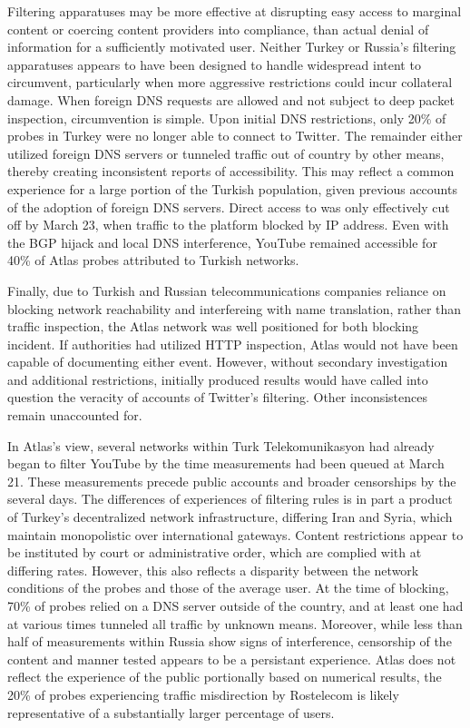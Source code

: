 Filtering apparatuses may be more effective at disrupting easy access to marginal content or coercing content providers into compliance, than actual denial of information for a sufficiently motivated user. Neither Turkey or Russia's filtering apparatuses appears to have been designed to handle widespread intent to circumvent, particularly when more aggressive restrictions could incur collateral damage. When foreign DNS requests are allowed and not subject to deep packet inspection, circumvention is simple. Upon initial DNS restrictions, only 20\% of probes in Turkey were no longer able to connect to Twitter. The remainder either utilized foreign DNS servers or tunneled traffic out of country by other means, thereby creating inconsistent reports of accessibility. This may reflect a common experience for a large portion of the Turkish population, given previous accounts of the adoption of foreign DNS servers. Direct access to  was only effectively cut off by March 23, when traffic to the platform blocked by IP address. Even with the BGP hijack and local DNS interference, YouTube remained accessible for 40\% of Atlas probes attributed to Turkish networks. 

Finally, due to Turkish and Russian telecommunications companies reliance on blocking network reachability and interfereing with name translation, rather than traffic inspection, the Atlas network was well positioned for both blocking incident. If authorities had utilized HTTP inspection, Atlas would not have been capable of documenting either event. However, without secondary investigation and additional restrictions, initially produced results would have called into question the veracity of accounts of Twitter's filtering. Other inconsistences remain unaccounted for. 

In Atlas's view, several networks within Turk Telekomunikasyon had already began to filter YouTube by the time measurements had been queued at March 21. These measurements precede public accounts and broader censorships by the several days. The differences of experiences of filtering rules is in part a product of Turkey's decentralized network infrastructure, differing Iran and Syria, which maintain monopolistic over international gateways. Content restrictions appear to be instituted by court or administrative order, which are complied with at differing rates. However, this also reflects a disparity between the network conditions of the probes and those of the average user. At the time of blocking, 70\% of probes relied on a DNS server outside of the country, and at least one had at various times tunneled all traffic by unknown means. Moreover, while less than half of measurements within Russia show signs of interference, censorship of the content and manner tested appears to be a persistant experience. Atlas does not reflect the experience of the public portionally based on numerical results, the 20\% of probes experiencing traffic misdirection by Rostelecom is likely representative of a substantially larger percentage of users.


